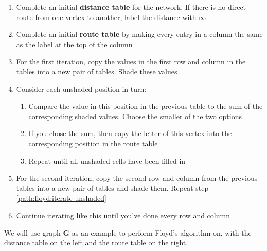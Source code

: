 \documentclass[../main.tex]{subfile}
\begin{document}
\begin{enumerate}
	\item Complete an initial \textbf{distance table} for the network. If there is no direct route from one vertex to another, label the distance with $\infty$
	\item Complete an initial \textbf{route table} by making every entry in a column the same as the label at the top of the column
	\item For the first iteration, copy the values in the first row and column in the tables into a new pair of tables. Shade these values
	\item\label{path:floyd:iterate-unshaded} Consider each unshaded position in turn: \begin{enumerate}
		\item Compare the value in this position in the previous table to the sum of the corresponding shaded values. Choose the smaller of the two options
		\item If you chose the sum, then copy the letter of this vertex into the corresponding position in the route table
		\item Repeat until all unshaded cells have been filled in
	\end{enumerate}
	\item For the second iteration, copy the second row and column from the previous tables into a new pair of tables and shade them. Repeat step \ref{path:floyd:iterate-unshaded}
	\item Continue iterating like this until you've done every row and column
\end{enumerate}

We will use graph $\mathbf{G}$ as an example to perform Floyd's algorithm on, with the distance table on the left and the route table on the right.
\end{document}
